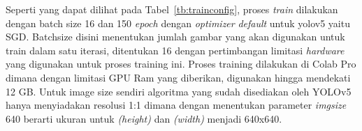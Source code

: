 
\par Seperti yang dapat dilihat pada Tabel~\ref{tb:trainconfig}, proses \emph{train} dilakukan dengan batch size 16 dan 150 \emph{epoch} dengan \emph{optimizer} \emph{default} untuk yolov5 yaitu SGD. Batch\textunderscore size disini menentukan jumlah gambar yang akan digunakan untuk train dalam satu iterasi, ditentukan 16 dengan pertimbangan limitasi \emph{hardware} yang digunakan untuk proses training ini. Proses training dilakukan di Colab Pro dimana dengan limitasi GPU Ram yang diberikan, digunakan hingga mendekati 12 GB. Untuk image size sendiri algoritma yang sudah disediakan oleh YOLOv5 hanya menyiadakan resolusi 1:1 dimana dengan menentukan parameter \emph{imgsize} 640 berarti ukuran untuk \emph{(height)} dan \emph{(width)} menjadi 640x640.


